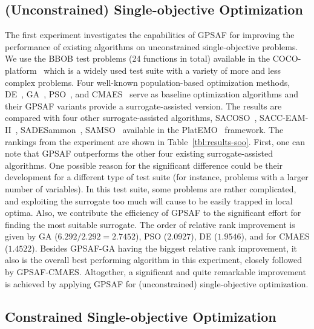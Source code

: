 \documentclass[journal]{IEEEtran}
\begin{document}
\subsection{(Unconstrained) Single-objective Optimization}









The first experiment investigates the capabilities of GPSAF for improving the performance of existing algorithms on unconstrained single-objective problems. 
We use the BBOB test problems (24 functions in total) available in the COCO-platform~\cite{2020-hansen-coco} which is a widely used test suite with a variety of more and less complex problems.
Four well-known population-based optimization methods, DE~\cite{1997-storn-de}, GA~\cite{1989-goldberg-ga}, PSO~\cite{1995-kennedy-pso}, and CMAES~\cite{2001-hansen-cmaes} serve as baseline optimization algorithms and their GPSAF variants provide a surrogate-assisted version.
The results are compared with four other surrogate-assisted algorithms, SACOSO~\cite{2017-sun-SACOSO}, SACC-EAM-II~\cite{2019-blanchard-SACCEAMII}, SADESammon~\cite{2020-chen-SADESammon}, SAMSO~\cite{2021-fan-samso} available in the PlatEMO~\cite{2017-platemo} framework.
The rankings from the experiment are shown in Table~\ref{tbl:results-soo}. First, one can note that \mbox{GPSAF} outperforms the other four existing surrogate-assisted algorithms. One possible reason for the significant difference could be their development for a different type of test suite (for instance, problems with a larger number of variables). In this test suite, some problems are rather complicated, and exploiting the surrogate too much will cause to be easily trapped in local optima. Also, we contribute the efficiency of GPSAF to the significant effort for finding the most suitable surrogate. The order of relative rank improvement is given by GA ($6.292 / 2.292 = 2.7452$), PSO ($2.0927$), DE ($1.9546$), and for CMAES ($1.4522$). Besides GPSAF-GA having the biggest relative rank improvement, it also is the overall best performing algorithm in this experiment, closely followed by GPSAF-CMAES.
Altogether, a significant and quite remarkable improvement is achieved by applying GPSAF for (unconstrained) single-objective optimization.  








\subsection{Constrained Single-objective Optimization}
\end{document}
